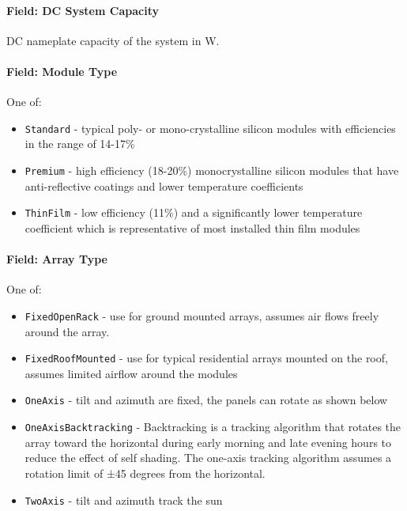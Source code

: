 \paragraph{Field: DC System Capacity}\label{field-dc-system-capacity}

DC nameplate capacity of the system in W.

\paragraph{Field: Module Type}\label{field-module-type}

One of:

\begin{itemize}
\tightlist
\item
  \texttt{Standard} - typical poly- or mono-crystalline silicon modules
  with efficiencies in the range of 14-17\%
\item
  \texttt{Premium} - high efficiency (18-20\%) monocrystalline silicon
  modules that have anti-reflective coatings and lower temperature
  coefficients
\item
  \texttt{ThinFilm} - low efficiency (11\%) and a significantly lower
  temperature coefficient which is representative of most installed thin
  film modules
\end{itemize}

\paragraph{Field: Array Type}\label{field-array-type}

One of:

\begin{itemize}
\tightlist
\item
  \texttt{FixedOpenRack} - use for ground mounted arrays, assumes air
  flows freely around the array.
\item
  \texttt{FixedRoofMounted} - use for typical residential arrays mounted
  on the roof, assumes limited airflow around the modules
\item
  \texttt{OneAxis} - tilt and azimuth are fixed, the panels can rotate
  as shown below
\item
  \texttt{OneAxisBacktracking} - Backtracking is a tracking algorithm
  that rotates the array toward the horizontal during early morning and
  late evening hours to reduce the effect of self shading. The one-axis
  tracking algorithm assumes a rotation limit of ±45 degrees from the
  horizontal.
\item
  \texttt{TwoAxis} - tilt and azimuth track the sun
\end{itemize}

